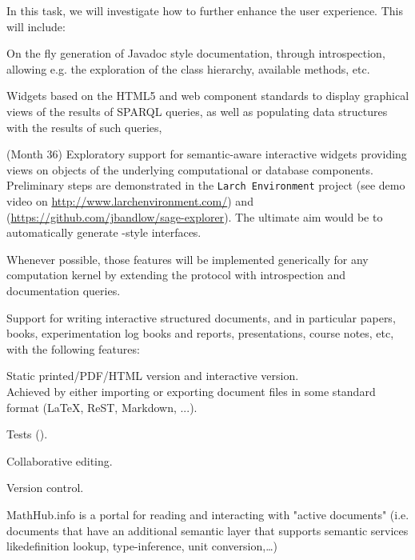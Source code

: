 \begin{workpackage}
\begin{tasklist}
\begin{task}[id=dynamic-inspect,title=Dynamic documentation and exploration system]
  In this task, we will investigate how to further enhance the user
  experience. This will include:
  \begin{compactitem}
  \item On the fly generation of Javadoc style documentation, through
    introspection, allowing e.g. the exploration of the class
    hierarchy, available methods, etc.
  \item Widgets based on the HTML5 and web component standards to display
    graphical views of the results of SPARQL queries, as well as populating data
    structures with the results of such queries,
  \item {} (Month 36)
    Exploratory support for semantic-aware interactive widgets
    providing views on objects of the underlying computational or
    database components. Preliminary steps are demonstrated in the
    \texttt{Larch Environment} project (see demo video on
    \url{http://www.larchenvironment.com/}) and
    (\url{https://github.com/jbandlow/sage-explorer}). The ultimate
    aim would be to automatically generate \LMFDB-style interfaces.
  \end{compactitem}
  Whenever possible, those features will be implemented generically
  for any computation kernel by extending the \Jupyter protocol with
  introspection and documentation queries.
\end{task}

\begin{task}[title=Structured documents,id=structdocs]
  Support for writing interactive structured documents, and in
  particular papers, books, experimentation log books and reports,
  presentations, course notes, etc, with the following features:
  \begin{compactitem}
  \item Static printed/PDF/HTML version and interactive version.\\
    Achieved by either importing or exporting document files in some
    standard format (LaTeX, ReST, Markdown, ...).
  \item Tests ().
  \item Collaborative editing.
  \item Version control.
  \end{compactitem}
  MathHub.info is a portal for reading and interacting with "active documents"
  (i.e. documents that have an additional semantic layer that supports semantic services
  likedefinition lookup, type-inference, unit conversion,\ldots)


\end{task}
\end{tasklist}
\end{workpackage}
